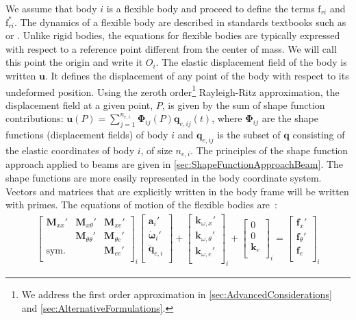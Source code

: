 \documentclass[wes, manuscript]{copernicus}
\renewcommand{\v}[1]{\boldsymbol{#1}}
\newcommand{\m}[1]{\boldsymbol{#1}}
\newcommand{\M} {{\m{M}}}
\newcommand{\kanef}{\mathrm{f}}
\begin{document}
We assume that body $i$ is a flexible body and proceed to define the terms $\kanef_{ri}$ and $\kanef_{ri}^*$.
The dynamics of a flexible body are described in standards textbooks 
such as \cite{shabana:book} or \cite{Schwertassek:book}.
Unlike rigid bodies, the equations for flexible bodies are typically expressed with respect to a reference point different from the center of mass.
We will call this point the origin and write it $O_i$.
The elastic displacement field of the body is written $\v{u}$.
It defines the displacement of any point of the body with respect to its undeformed position.
Using the zeroth order\footnote{We address the first order approximation in \autoref{sec:AdvancedConsiderations} and \autoref{sec:AlternativeFormulations}.} Rayleigh-Ritz approximation, the displacement field at a given point, $P$, is given by the sum of shape function contributions: $\v{u}(P)=\sum_{j=1}^{n_{e,i}} \v{\Phi}_{ij}(P) \v{q}_{e,ij}(t)$, where $\m{\Phi}_{ij}$ are the shape functions (displacement fields) of body $i$ and $\v{q}_{e,ij}$ is the subset of $\v{q}$ consisting of the elastic coordinates of body $i$, of size $n_{e,i}$.
The principles of the shape function approach applied to beams are given in \autoref{sec:ShapeFunctionApproachBeam}.
The shape functions are more easily represented in the body coordinate system.  
Vectors and matrices that are explicitly written in the body frame will be written with primes.
The equations of motion of the flexible bodies are~\citep{Wallrapp:1994}:
\begin{align}
    \begin{bmatrix}
       \M_{xx}'    & \M_{x \theta}' & \M_{ x e }' \\
                   & \M_{\theta \theta}'   & \M_{\theta e}'   \\
       \text{sym.} &            & \M_{e e}'  \\
    \end{bmatrix}_i
    \begin{bmatrix}
      \v{a}_i' \\
      \v{\dot{\omega}}_i' \\
      \v{\ddot{q}}_{e,i} \\
    \end{bmatrix}
      +
    \begin{bmatrix}
      \v{k}_{\omega, x}' \\
      \v{k}_{\omega, \theta}' \\
      \v{k}_{\omega, e}' \\
    \end{bmatrix}_i
      +
    \begin{bmatrix}
      0 \\
      0 \\
      \v{k}_{e}\\
    \end{bmatrix}_i
      =
    \begin{bmatrix}
      \v{f}_{x}' \\
      \v{f}_{\theta}' \\
      \v{f}_{e}\\
    \end{bmatrix}_i
    \label{eq:EOMFlexibleBody}
\end{align}
\end{document}

